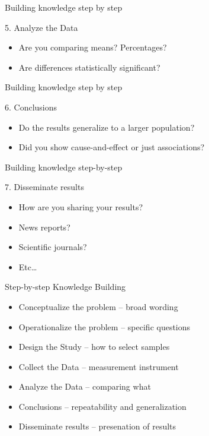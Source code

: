 \documentclass[14pt]{beamer}\usepackage[]{graphicx}\usepackage[]{color}
\begin{document}
\begin{frame}[fragile]{Building knowledge step by step}

5. Analyze the Data

\begin{itemize}
\item Are you comparing means? Percentages?
\item Are differences statistically significant?
\end{itemize}
\end{frame}

\begin{frame}[fragile]{Building knowledge step by step}

6. Conclusions

\begin{itemize}
\item Do the results generalize to a larger population?
\item Did you show cause-and-effect or just associations?
\end{itemize}
\end{frame}

\begin{frame}[fragile]{Building knowledge step-by-step}

7. Disseminate results

\begin{itemize}
\item How are you sharing your results?  
\item News reports? 
\item Scientific journals? 
\item Etc…
\end{itemize}
\end{frame}

\begin{frame}[fragile]{Step-by-step Knowledge Building }

\begin{itemize}
\item Conceptualize the problem -- broad wording
\item Operationalize the problem -- specific questions
\item Design the Study -- how to select samples
\item Collect the Data -- measurement instrument
\item Analyze the Data -- comparing what
\item Conclusions -- repeatability and generalization
\item Disseminate results -- presenation of results
\end{itemize}
\end{frame}
\end{document}
